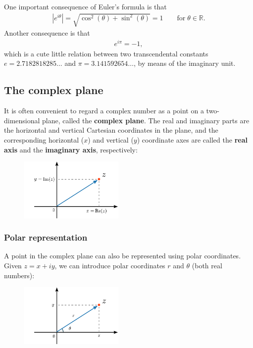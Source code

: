 \documentclass[10pt,a4paper]{article}
\begin{document}
One important consequence of Euler's formula is that
\begin{align}
  \left|e^{i\theta}\right| = \sqrt{\cos^2(\theta) + \sin^2(\theta)} = 1 \qquad \mathrm{for}\; \theta \in \mathbb{R}.
\end{align}
Another consequence is that
\begin{align}
  e^{i\pi} = -1,
\end{align}
which is a cute little relation between two transcendental constants
$e = 2.7182818285\dots$ and $\pi = 3.141592654\dots$, by means of the
imaginary unit.

\subsection{The complex plane}
\label{the-complex-plane}

It is often convenient to regard a complex number as a point on a
two-dimensional plane, called the \textbf{complex plane}.  The real
and imaginary parts are the horizontal and vertical Cartesian
coordinates in the plane, and the corresponding horizontal ($x$) and
vertical ($y$) coordinate axes are called the \textbf{real axis} and
the \textbf{imaginary axis}, respectively:

\begin{figure}[ht]
  \centering\includegraphics[width=0.45\textwidth]{complex_plane}
\end{figure}

\subsubsection{Polar representation}
\label{polar-representation}

A point in the complex plane can also be represented using polar
coordinates. Given $z = x + i y$, we can introduce polar coordinates
$r$ and $\theta$ (both real numbers):

\begin{figure}[ht]
  \centering\includegraphics[width=0.45\textwidth]{complex_plane2}
\end{figure}
\end{document}
